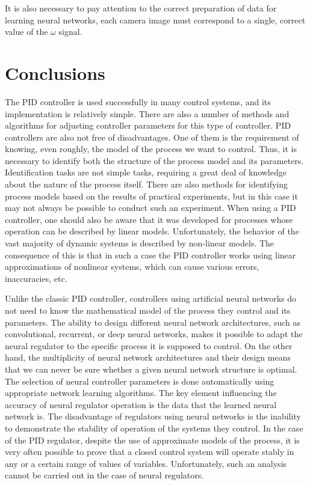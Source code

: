 \documentclass[conference]{IEEEtran}
\begin{document}
It is also necessary to pay attention to the correct preparation of data for learning neural networks, each camera image must correspond to a single, correct value of the $\omega$ signal.


\section{Conclusions}\label{sec:conclusion}
The PID controller is used successfully in many control systems, and its implementation is relatively simple. There are also a number of methods and algorithms for adjusting controller parameters for this type of controller. PID controllers are also not free of disadvantages. One of them is the requirement of knowing, even roughly, the model of the process we want to control. Thus, it is necessary to identify both the structure of the process model and its parameters. Identification tasks are not simple tasks, requiring a great deal of knowledge about the nature of the process itself. There are also methods for identifying process models based on the results of practical experiments, but in this case it may not always be possible to conduct such an experiment. When using a PID controller, one should also be aware that it was developed for processes whose operation can be described by linear models. Unfortunately, the behavior of the vast majority of dynamic systems is described by non-linear models. The consequence of this is that in such a case the PID controller works using linear approximations of nonlinear systems, which can cause various errors, inaccuracies, etc.

Unlike the classic PID controller, controllers using artificial neural networks do not need to know the mathematical model of the process they control and its parameters. The ability to design different neural network architectures, such as convolutional, recurrent, or deep neural networks, makes it possible to adapt the neural regulator to the specific process it is supposed to control. On the other hand, the multiplicity of neural network architectures and their design means that we can never be sure whether a given neural network structure is optimal.
The selection of neural controller parameters is done automatically using appropriate network learning algorithms.  The key element influencing the accuracy of neural regulator operation is the data that the learned neural network is. The disadvantage of regulators using neural networks is the inability to demonstrate the stability of operation of the systems they control. In the case of the PID regulator, despite the use of approximate models of the process, it is very often possible to prove that a closed control system will operate stably in any or a certain range of values of variables. Unfortunately, such an analysis cannot be carried out in the case of neural regulators. 
\end{document}
